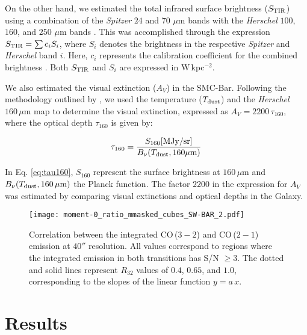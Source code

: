 \documentclass[baaa]{baaa}
\begin{document}
On the other hand, we estimated the total infrared surface brightness ($S_{\rm TIR}$) using a combination of the {\it Spitzer} $24$ and $70$ $\mu$m bands with the {\it Herschel} $100$, $160$, and $250$ $\mu$m bands \citep{Jameson_2018_ApJ_853_111J}. This was accomplished through the expression $S_{\rm TIR} = \sum{c_{i}S_{i}}$, where $S_{i}$ denotes the brightness in the respective {\it Spitzer} and {\it Herschel} band $i$. Here, $c_{i}$ represents the calibration coefficient for the combined brightness \citep[][]{Galametz_2013_MNRAS_431_1956G}. Both $S_{\rm TIR}$ and $S_{i}$ are expressed in W\,kpc$^{-2}$.

We also estimated the visual extinction ($A_V$) in the SMC-Bar. Following the methodology outlined by \cite{Lee_2015MNRAS_450_2708L}, we used the temperature ($T_{\rm dust}$) and the {\it Herschel} $160\,\mu$m map \citep{Gordon_2014_ApJ_797_85G} to determine the visual extinction, expressed as $A_V = 2200\,\tau_{160}$, where the optical depth $\tau_{160}$ is given by:

\begin{equation}
    \tau_{160} = \dfrac{S_{160}{\rm [MJy/sr]}}{B_{\nu}(T_{\rm dust},160\mu{\rm m})}
    \label{eq:tau160}
\end{equation}

\noindent
In Eq. \ref{eq:tau160}, $S_{160}$ represent the surface brightness at $160\,\mu$m and $B_{\nu}(T_{\rm dust},160\,\mu{\rm m})$ the Planck function. The factor $2200$ in the expression for $A_{V}$ was estimated by comparing visual extinctions and optical depths in the Galaxy.

\begin{figure}[h]
    \centering
    \texttt{[image: moment-0\_ratio\_mmasked\_cubes\_SW-BAR\_2.pdf]}
    \caption{Correlation between the integrated CO\,($3-2$) and CO\,($2-1$) emission at $40''$ resolution. All values correspond to regions where the integrated emission in both transitions has S/N $\ge 3$. The dotted and solid lines represent $R_{32}$ values of $0.4$, $0.65$, and $1.0$, corresponding to the slopes of the linear function $y = a\,x$.}
    \label{fig:CO_correlation}
\end{figure}

\section{Results}
\label{sec:results}
\end{document}
